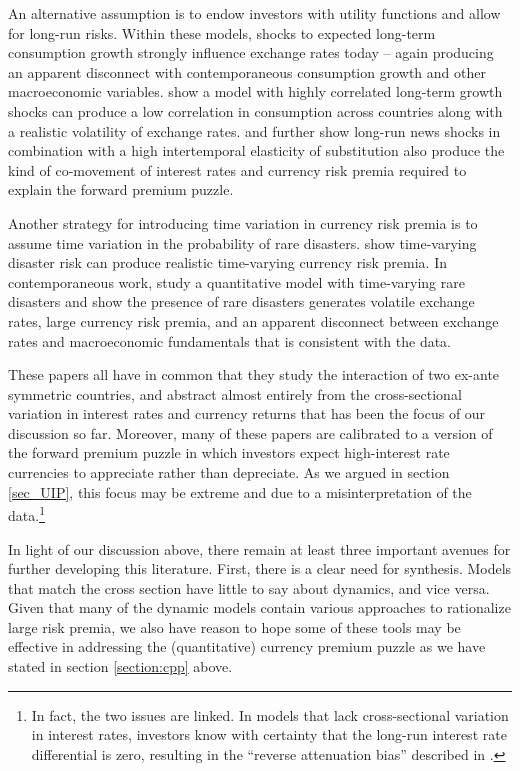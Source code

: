 \documentclass[11pt]{article}
\begin{document}
An alternative assumption is to endow investors with \cite{EpsteinZin1989} utility functions and allow for long-run risks. Within these models, shocks to expected long-term consumption growth strongly influence exchange rates today -- again producing an apparent disconnect with contemporaneous consumption growth and other macroeconomic variables. \citet{ColacitoCroce2011} show a model with highly correlated long-term growth shocks can produce a low correlation in consumption across countries along with a realistic volatility of exchange rates. \citet{BansalShaliastovich2012} and \citet{ColacitoCroce2013} further show long-run news shocks in combination with a high intertemporal elasticity of substitution also produce the kind of co-movement of interest rates and currency risk premia required to explain the forward premium puzzle. 

Another strategy for introducing time variation in currency risk premia is to assume time variation in the probability of rare disasters. \citet{FarhiGabaix2016} show time-varying disaster risk can produce realistic time-varying currency risk premia. In contemporaneous work, \citet{GourioSiemerVerdelhan2011} study a quantitative model with time-varying rare disasters and show the presence of rare disasters generates volatile exchange rates, large currency risk premia, and an apparent disconnect between exchange rates and macroeconomic fundamentals that is consistent with the data.

These papers all have in common that they study the interaction of two ex-ante symmetric countries, and abstract almost entirely from the cross-sectional variation in interest rates and currency returns that has been the focus of our discussion so far. Moreover, many of these papers are calibrated to a version of the forward premium puzzle in which investors expect high-interest rate currencies to appreciate rather than depreciate. As we argued in section \ref{sec_UIP}, this focus may be extreme and due to a misinterpretation of the data.\footnote{In fact, the two issues are linked. In models that lack cross-sectional variation in interest rates, investors know with certainty that the long-run interest rate differential is zero, resulting in the ``reverse attenuation bias'' described in \cite{HassanMano2019}.} 

In light of our discussion above, there remain at least three important avenues for further developing this literature. First, there is a clear need for synthesis. Models that match the cross section have little to say about dynamics, and vice versa. Given that many of the dynamic models contain various approaches to rationalize large risk premia, we also have reason to hope some of these tools may be effective in addressing the (quantitative) currency premium puzzle as we have stated in section \ref{section:cpp} above. 
\end{document}

